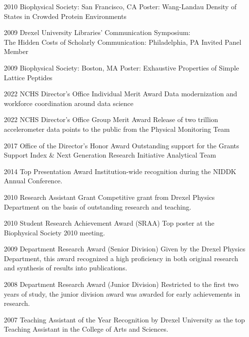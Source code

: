 \documentclass[]{scrartcl}
\begin{document}
\begin{cleanCV}
\WorkExperienceX
{2010}
{Biophysical Society: San Francisco, CA}
{Poster: Wang-Landau Density of States in Crowded Protein Environments}

\WorkExperienceX
{2009}
{Drexel University Libraries' Communication Symposium:\\The Hidden Costs of Scholarly Communication: Philadelphia, PA}
{Invited Panel Member}

\WorkExperienceX
{2009}
{Biophysical Society: Boston, MA}
{Poster: Exhaustive Properties of Simple Lattice Peptides}



\newpage


\WorkExperienceX
{2022}
{NCHS Director's Office Individual Merit Award}
{Data modernization and workforce coordination around data science}

\WorkExperienceX
{2022}
{NCHS Director's Office Group Merit Award}
{Release of two trillion accelerometer data points to the public from the Physical Monitoring Team}

\WorkExperienceX
{2017}
{Office of the Director's Honor Award}
{Outstanding support for the Grants Support Index \& Next Generation Research Initiative Analytical Team}

\WorkExperienceX
{2014}
{Top Presentation Award}
{Institution-wide recognition during the NIDDK Annual Conference.}

\WorkExperienceX
{2010}
{Research Assistant Grant}
{Competitive grant from Drexel Physics Department on the basis of outstanding research and teaching.}

\WorkExperienceX
{2010}
{Student Research Achievement Award (SRAA)}
{Top poster at the Biophysical Society 2010 meeting. }

\WorkExperienceX
{2009}
{Department Research Award (Senior Division)}
{Given by the Drexel Physics Department, this award recognized a high proficiency in both original research and synthesis of results into publications.}

\WorkExperienceX
{2008}
{Department Research Award (Junior Division)}
{Restricted to the first two years of study, the junior division award was awarded for early achievements in research.}

\WorkExperienceX
{2007}
{Teaching Assistant of the Year}
{Recognition by Drexel University as the top Teaching Assistant in the College of Arts and Sciences.}



\end{cleanCV}
\end{document}
